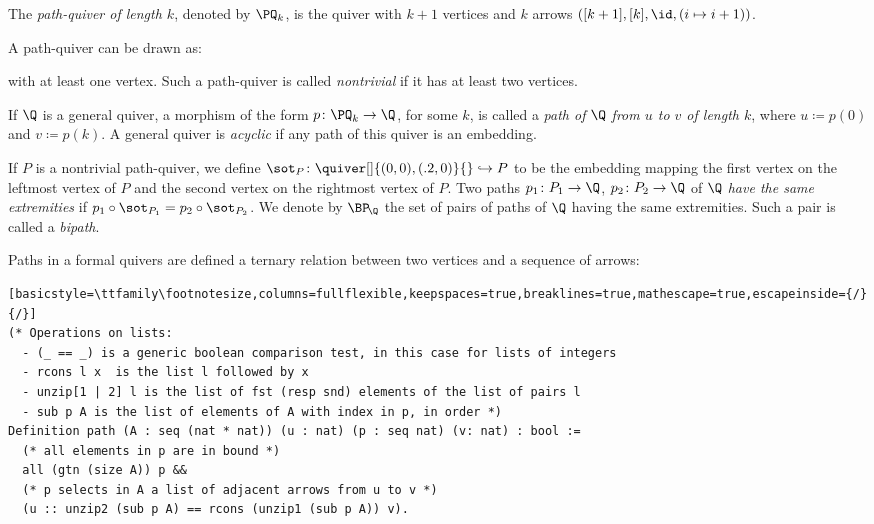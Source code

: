 \begin{definition}\label{def:pathquiv}
  The \emph{path-quiver of length $k$}, denoted by $\PQ_k$, is the quiver
  with $k+1$ vertices and $k$ arrows $([k+1], [k], \id, (i \mapsto i + 1))$.
\end{definition}

A path-quiver can be drawn as:
\begin{center} 
\end{center}
with at least one vertex. Such a path-quiver is called \emph{nontrivial} if it has at least two vertices.

If $\Q$ is a general quiver, a morphism of the form $p\colon \PQ_k \to \Q$, for some $k$, is called a \emph{path of\/ $\Q$ from $u$ to $v$ of length $k$}, where $u \coloneqq p(0)$ and $v \coloneqq p(k)$. A general quiver is \emph{acyclic} if any path of this quiver is an embedding.

If $P$ is a nontrivial path-quiver, we define $\sot_P\colon \quiver[]{(0,0),(.2,0)}{} \hookrightarrow P$ to be the embedding mapping the first vertex on the leftmost vertex of $P$ and the second vertex on the rightmost vertex of $P$. Two paths $p_1\colon P_1 \to \Q$, $p_2\colon P_2 \to \Q$ of $\Q$ \emph{have the same extremities} if $p_1 \circ \sot_{P_1} = p_2 \circ \sot_{P_2}$. We denote by $\BP_{\!\Q}$ the set of pairs of paths of $\Q$ having the same extremities. Such a pair is called a \emph{bipath}.

Paths in a formal quivers are defined a ternary relation between two vertices and a sequence of arrows:
\begin{lstlisting}[basicstyle=\ttfamily\footnotesize,columns=fullflexible,keepspaces=true,breaklines=true,mathescape=true,escapeinside={/}{/}]
(* Operations on lists:
  - (_ == _) is a generic boolean comparison test, in this case for lists of integers
  - rcons l x  is the list l followed by x
  - unzip[1 | 2] l is the list of fst (resp snd) elements of the list of pairs l
  - sub p A is the list of elements of A with index in p, in order *)
Definition path (A : seq (nat * nat)) (u : nat) (p : seq nat) (v: nat) : bool :=
  (* all elements in p are in bound *)
  all (gtn (size A)) p &&
  (* p selects in A a list of adjacent arrows from u to v *)
  (u :: unzip2 (sub p A) == rcons (unzip1 (sub p A)) v).
\end{lstlisting}

